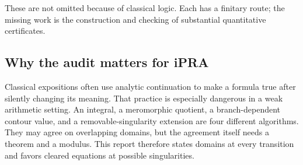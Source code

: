 These are not omitted because of classical logic.  Each has a finitary route; the missing work is the construction and checking of substantial quantitative certificates.

\subsection{Why the audit matters for iPRA}

Classical expositions often use analytic continuation to make a formula true after silently changing its meaning.  That practice is especially dangerous in a weak arithmetic setting.  An integral, a meromorphic quotient, a branch-dependent contour value, and a removable-singularity extension are four different algorithms.  They may agree on overlapping domains, but the agreement itself needs a theorem and a modulus.  This report therefore states domains at every transition and favors cleared equations at possible singularities.
